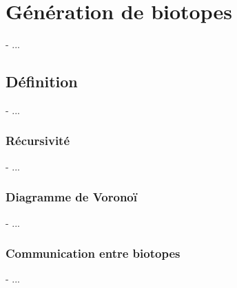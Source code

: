 \chapter{Génération de biotopes}
\minitoc

- ...

\section{Définition}
- ...

\subsection{Récursivité}
- ...

\subsection{Diagramme de Voronoï}
- ...

\subsection{Communication entre biotopes}
- ...

